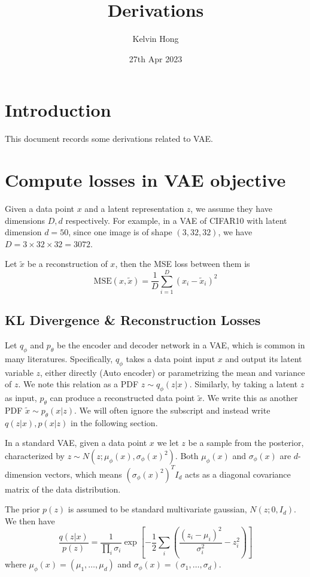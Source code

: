 \documentclass[12pt]{article}
\theoremstyle{remark}
\numberwithin{equation}{section}
\newcommand{\mse}{\text{MSE}}
\begin{document}
\title{Derivations}
\author{Kelvin Hong}
\date{27th Apr 2023}

\maketitle

\section{Introduction}

This document records some derivations related to VAE.

\section{Compute losses in VAE objective}

Given a data point $x$ and a latent representation $z$, 
we assume they have dimensions $D, d$ respectively. 
For example, in a VAE of CIFAR10 with latent dimension $d=50$, 
since one image is of shape $(3,32,32)$, 
we have $D=3\times 32\times 32=3072$.  

Let $\tilde x$ be a reconstruction of $x$, then the MSE loss between them 
is
$$\mse(x,\tilde x)=\frac1D\sum_{i=1}^D (x_i-\tilde x_i)^2$$

\subsection{KL Divergence \& Reconstruction Losses}
Let $q_\phi$ and $p_\theta$ be the encoder and decoder network
in a VAE, which is common in many literatures. 
Specifically, $q_\phi$ takes a data point input $x$ and 
output its latent variable $z$, either directly (Auto encoder)
or parametrizing the mean and variance of $z$. 
We note this relation as a PDF $z\sim q_\phi(z|x)$. 
Similarly, by taking a latent $z$ as input, $p_\theta$ 
can produce a reconstructed data point $\tilde x$.
We write this as another PDF $\tilde x\sim p_\theta(x|z)$.  
We will often ignore the subscript and instead write
$q(z|x), p(x|z)$ in the following section. 
 
In a standard VAE, given a data point $x$ we let $z$ be a 
sample from the posterior, characterized by 
$z\sim N(z; \mu_\phi(x), \sigma_\phi(x)^2)$. 
Both $\mu_\phi(x)$ and $\sigma_\phi(x)$ are $d$-dimension 
vectors, which means $(\sigma_\phi(x)^2)^T I_d$ acts as a 
diagonal covariance matrix of the data distribution. 

The prior $p(z)$ is assumed to be standard multivariate 
gaussian, $N(z; 0, I_d)$. 
We then have 
$$\frac{q(z|x)}{p(z)} = \frac1{\prod_i \sigma_i} \exp\left[
    -\frac12 \sum_i\left(
         \frac{(z_i-\mu_i)^2}{\sigma_i^2} - z_i^2
    \right)
\right]$$
where $\mu_\phi(x)=(\mu_1,\dots, \mu_d)$ and 
$\sigma_\phi(x)=(\sigma_1,\dots,\sigma_d)$.
\end{document}
